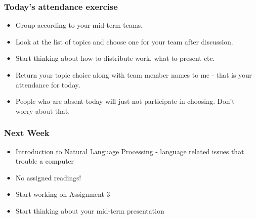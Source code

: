 \documentclass{beamer}
\begin{document}
\begin{frame}
\frametitle{Today's attendance exercise}
\begin{itemize}
\item Group according to your mid-term teams.
\item Look at the list of topics and choose one for your team after discussion.
\item Start thinking about how to distribute work, what to present etc.
\item Return your topic choice along with team member names to me - that is your attendance for today. 
\item People who are absent today will just not participate in choosing. Don't worry about that.
\end{itemize}
\end{frame}

\begin{frame}
\frametitle{Next Week}
\begin{itemize}
\item Introduction to Natural Language Processing - language related issues that trouble a computer
\item No assigned readings!
\item Start working on Assignment 3
\item Start thinking about your mid-term presentation
\end{itemize}
\end{frame}
\end{document}
